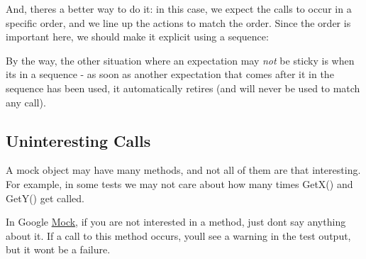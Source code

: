 And, there\textquotesingle{}s a better way to do it\+: in this case, we expect the calls to occur in a specific order, and we line up the actions to match the order. Since the order is important here, we should make it explicit using a sequence\+:


\begin{DoxyCode}{0}
\DoxyCodeLine{\{}
\DoxyCodeLine{}
\DoxyCodeLine{  \}}
\DoxyCodeLine{\}}
\end{DoxyCode}


By the way, the other situation where an expectation may {\itshape not} be sticky is when it\textquotesingle{}s in a sequence -\/ as soon as another expectation that comes after it in the sequence has been used, it automatically retires (and will never be used to match any call).

\subsection*{Uninteresting Calls}

A mock object may have many methods, and not all of them are that interesting. For example, in some tests we may not care about how many times {\ttfamily Get\+X()} and {\ttfamily Get\+Y()} get called.

In Google \mbox{\hyperlink{class_mock}{Mock}}, if you are not interested in a method, just don\textquotesingle{}t say anything about it. If a call to this method occurs, you\textquotesingle{}ll see a warning in the test output, but it won\textquotesingle{}t be a failure.

